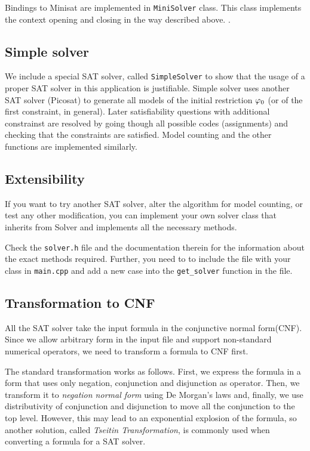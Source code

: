 Bindings to Minisat are implemented in \texttt{MiniSolver} class.
This class implements the context opening and closing in the way described above.
.

\subsection{Simple solver}

We include a special SAT solver, called \texttt{SimpleSolver} to show that
  the usage of a proper SAT solver in this application is justifiable.
Simple solver uses another SAT solver (Picosat) to generate all
  models of the initial restriction $\varphi_0$ (or of the first constraint, in general).
Later satisfiability questions with additional constrainst are
  resolved by going though all possible codes (assignments) and
  checking that the constraints are satisfied.
Model counting and the other functions are implemented similarly.

\subsection{Extensibility}
If you want to try another SAT solver, alter the algorithm for model counting,
  or test any other modification,
  you can implement your own solver class that inherits from Solver and
  implements all the necessary methods.

Check the \texttt{solver.h} file and the documentation therein
  for the information about the exact methods required.
Further, you need to to include the file with your class in
  \texttt{main.cpp} and add a new case
  into the \texttt{get\_solver} function in the file.

\subsection{Transformation to CNF}

All the SAT solver take the input formula in the conjunctive normal form(CNF).
Since we allow arbitrary form in the input file and support non-standard
  numerical operators, we need to transform a formula to CNF first.

The standard transformation works as follows.
First, we express the formula in a form
  that uses only negation, conjunction and disjunction as operator.
Then, we transform it to \emph{negation normal form} using De Morgan's laws
  and, finally, we use distributivity of conjunction and disjunction to
  move all the conjunction to the top level.
However, this may lead to an exponential explosion of the formula, so
another solution, called \emph{Tseitin Transformation}, is commonly used
  when converting a formula for a SAT solver. 

